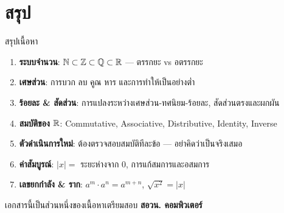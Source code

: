 \documentclass[11pt, aspectratio=169]{beamer}
\begin{document}
\section{สรุป}

\begin{frame}{สรุปเนื้อหา}
  \begin{explanation}[สิ่งที่ได้เรียนรู้]
    \begin{enumerate}
      \item \textbf{ระบบจำนวน}: $\mathbb{N} \subset \mathbb{Z} \subset \mathbb{Q} \subset \mathbb{R}$ — ตรรกยะ vs อตรรกยะ
      \item \textbf{เศษส่วน}: การบวก ลบ คูณ หาร และการทำให้เป็นอย่างตํ่า
      \item \textbf{ร้อยละ \& สัดส่วน}: การแปลงระหว่างเศษส่วน-ทศนิยม-ร้อยละ, สัดส่วนตรงและผกผัน
      \item \textbf{สมบัติของ $\mathbb{R}$}: Commutative, Associative, Distributive, Identity, Inverse
      \item \textbf{ตัวดำเนินการใหม่}: ต้องตรวจสอบสมบัติทีละข้อ — อย่าคิดว่าเป็นจริงเสมอ
      \item \textbf{ค่าสัมบูรณ์}: $|x| = $ ระยะห่างจาก 0, การแก้สมการและอสมการ
      \item \textbf{เลขยกกำลัง \& ราก}: $a^m \cdot a^n = a^{m+n}$, $\sqrt{x^2} = |x|$
    \end{enumerate}
  \end{explanation}

  \begin{center}
    \large เอกสารนี้เป็นส่วนหนึ่งของเนื้อหาเตรียมสอบ \textbf{สอวน. คอมพิวเตอร์}
  \end{center}
\end{frame}
\end{document}
